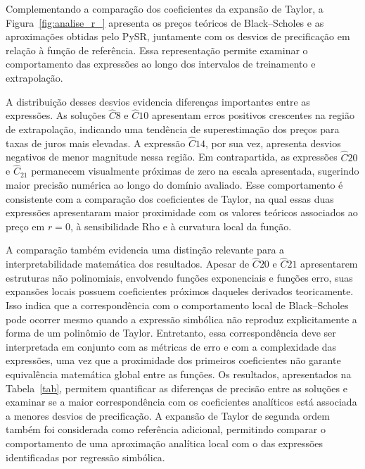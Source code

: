 Complementando a comparação dos coeficientes da expansão de Taylor, a Figura~\ref{fig:analise_r_} apresenta os preços teóricos de Black--Scholes e as aproximações obtidas pelo PySR, juntamente com os desvios de precificação em relação à função de referência. Essa representação permite examinar o comportamento das expressões ao longo dos intervalos de treinamento e extrapolação.

A distribuição desses desvios evidencia diferenças importantes entre as expressões. As soluções $\widehat{C}8$ e $\widehat{C}{10}$ apresentam erros positivos crescentes na região de extrapolação, indicando uma tendência de superestimação dos preços para taxas de juros mais elevadas. A expressão $\widehat{C}{14}$, por sua vez, apresenta desvios negativos de menor magnitude nessa região. Em contrapartida, as expressões $\widehat{C}{20}$ e $\widehat{C}_{21}$ permanecem visualmente próximas de zero na escala apresentada, sugerindo maior precisão numérica ao longo do domínio avaliado. Esse comportamento é consistente com a comparação dos coeficientes de Taylor, na qual essas duas expressões apresentaram maior proximidade com os valores teóricos associados ao preço em $r=0$, à sensibilidade Rho e à curvatura local da função.

A comparação também evidencia uma distinção relevante para a interpretabilidade matemática dos resultados. Apesar de $\widehat{C}{20}$ e $\widehat{C}{21}$ apresentarem estruturas não polinomiais, envolvendo funções exponenciais e funções erro, suas expansões locais possuem coeficientes próximos daqueles derivados teoricamente. Isso indica que a correspondência com o comportamento local de Black--Scholes pode ocorrer mesmo quando a expressão simbólica não reproduz explicitamente a forma de um polinômio de Taylor. Entretanto, essa correspondência deve ser interpretada em conjunto com as métricas de erro e com a complexidade das expressões, uma vez que a proximidade dos primeiros coeficientes não garante equivalência matemática global entre as funções.
Os resultados, apresentados na Tabela~\ref{tab}, permitem quantificar as diferenças de precisão entre as soluções e examinar se a maior correspondência com os coeficientes analíticos está associada a menores desvios de precificação. A expansão de Taylor de segunda ordem também foi considerada como referência adicional, permitindo comparar o comportamento de uma aproximação analítica local com o das expressões identificadas por regressão simbólica.


